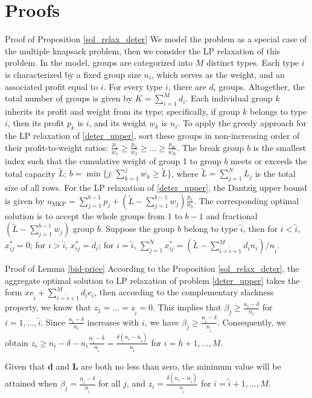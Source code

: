 \clearpage
\section{Proofs}

\begin{pf}{Proof of Proposition \ref{sol_relax_deter}}
  We model the problem as a special case of the multiple knapsack problem, then we consider the LP relaxation of this problem. In the model, groups are categorized into $M$ distinct types. Each type $i$ is characterized by a fixed group size $n_i$, which serves as the weight, and an associated profit equal to $i$. For every type $i$, there are $d_i$ groups. Altogether, the total number of groups is given by $K = \sum_{i=1}^{M} d_i$. Each individual group $k$ inherits its profit and weight from its type; specifically, if group $k$ belongs to type $i$, then its profit $p_k$ is $i$, and its weight $w_k$ is $n_i$. To apply the greedy approach for the LP relaxation of \eqref{deter_upper}, sort these groups in non-increasing order of their profit-to-weight ratios: $\frac{p_1}{w_1} \geq \frac{p_2}{w_2} \geq \ldots \geq \frac{p_K}{w_K}$. The break group $b$ is the smallest index such that the cumulative weight of group 1 to group $b$ meets or exceeds the total capacity $\tilde{L}$: $b=\min \{j: \sum_{k=1}^j w_k \geq \tilde{L}\}$, where $\tilde{L} = \sum_{j=1}^{N} L_j$ is the total size of all rows. For the LP relaxation of \eqref{deter_upper}, the Dantzig upper bound \citep{dantzig1957discrete} is given by $u_{\mathrm{MKP}}=\sum_{j=1}^{b-1} p_j+\left(\tilde{L}-\sum_{j=1}^{b-1} w_j\right) \frac{p_b}{w_b}$. The corresponding optimal solution is to accept the whole groups from $1$ to $b-1$ and fractional $(\tilde{L}-\sum_{j=1}^{b-1} w_j)$ group $b$. Suppose the group $b$ belong to type $\tilde{i}$, then for $i < \tilde{i}$, $x_{ij}^{*} = 0$; for $i > \tilde{i}$, $x_{ij}^{*} = d_{i}$; for $i = \tilde{i}$, $\sum_{j=1}^{N} x_{ij}^{*} = (\tilde{L} - \sum_{i = \tilde{i}+1}^{M} {d_i n_i})/ n_{\tilde{i}}$.
\end{pf}


\begin{pf}{Proof of Lemma \ref{bid-price}}
According to the Proposition \ref{sol_relax_deter}, the aggregate optimal solution to LP relaxation of problem \eqref{deter_upper} takes the form $x e_{\tilde{i}} + \sum_{i=\tilde{i}+1} ^{M} d_{i} e_{i}$, then according to the complementary slackness property, we know that $z_1= \ldots= z_{\tilde{i}} = 0$. This implies that $\beta_j \geq \frac{n_i - \delta}{n_i}$ for $i = 1,\ldots, \tilde{i}$. Since $\frac{n_i - \delta}{n_i}$ increases with $i$, we have $\beta_j \geq \frac{n_{\tilde{i}} - \delta}{n_{\tilde{i}}}$. Consequently, we obtain $z_{i} \geq n_i - \delta - n_i \frac{n_{\tilde{i}} - \delta}{n_{\tilde{i}}} = \frac{\delta(n_i-n_{\tilde{i}})}{n_{\tilde{i}}}$ for $i = h+1, \ldots, M$.

Given that $\mathbf{d}$ and $\mathbf{L}$ are both no less than zero, the minimum value will be attained when $\beta_j = \frac{n_{\tilde{i}} - \delta}{n_{\tilde{i}}}$ for all $j$, and $z_i = \frac{\delta(n_i-n_{\tilde{i}})}{n_{\tilde{i}}}$ for $i = \tilde{i}+1, \ldots, M$.  
\end{pf}

\newpage